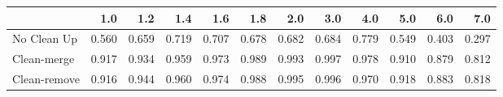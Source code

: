 \begin{tabular}{lrrrrrrrrrrr}
\toprule
{} &   1.0 &   1.2 &   1.4 &   1.6 &   1.8 &   2.0 &   3.0 &   4.0 &   5.0 &   6.0 &   7.0 \\
\midrule
No Clean Up  & 0.560 & 0.659 & 0.719 & 0.707 & 0.678 & 0.682 & 0.684 & 0.779 & 0.549 & 0.403 & 0.297 \\
Clean-merge  & 0.917 & 0.934 & 0.959 & 0.973 & 0.989 & 0.993 & 0.997 & 0.978 & 0.910 & 0.879 & 0.812 \\
Clean-remove & 0.916 & 0.944 & 0.960 & 0.974 & 0.988 & 0.995 & 0.996 & 0.970 & 0.918 & 0.883 & 0.818 \\
\bottomrule
\end{tabular}
